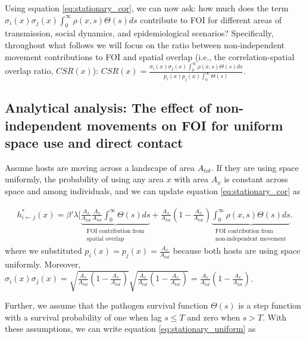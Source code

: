 \documentclass[letterpaper]{article}
\begin{document}
Using equation \ref{eq:stationary_cor}, we can now ask: how much does the term $\sigma_i(x) \sigma_j(x) \int_{0}^{\infty} \rho(x, s) \Theta(s) ds$ contribute to FOI for different areas of transmission, social dynamics, and epidemiological scenarios? Specifically, throughout what follows we will focus on the ratio between non-independent movement contributions to FOI and spatial overlap (i.e., the correlation-spatial overlap ratio, $CSR(x)$): $CSR(x) = \frac{\sigma_i(x) \sigma_j(x) \int_{0}^{\infty} \rho(x, s) \Theta(s) ds}{p_i(x) p_j(x) \int_{0}^{\infty} \Theta(s)}$.  %

\subsection*{Analytical analysis: The effect of non-independent movements on FOI for uniform space use and direct contact}

Assume hosts are moving across a landscape of area $A_{tot}$. If they are using space uniformly, the probability of using any area $x$ with area $A_x$ is constant across space and among individuals, and we can update equation \ref{eq:stationary_cor} as

\begin{equation}
    \begin{aligned}
    h^*_{i \leftarrow j}(x) = \beta' \lambda [ \underbrace{\frac{A_x}{A_{tot}}\frac{A_x}{A_{tot}} \int_{0}^{\infty} \Theta(s) ds}_{\substack{\text{FOI contribution from} \\ \text{spatial overlap}}} + \frac{A_x}{A_{tot}} (1 - \frac{A_x}{A_{tot}})\underbrace{\int_{0}^{\infty} \rho(x, s) \Theta(s) ds}_{\substack{\text{FOI contribution from} \\ \text{non-independent movement}}}.
    \end{aligned}
    \label{eq:stationary_uniform}
\end{equation}
where we substituted $p_i(x) = p_j(x) = \frac{A_x}{A_{tot}}$ because both hosts are using space uniformly.  Moreover, $\sigma_i(x) \sigma_j(x) = \sqrt{\frac{A_x}{A_{tot}}(1 - \frac{A_x}{A_{tot}})}\sqrt{\frac{A_x}{A_{tot}}(1 - \frac{A_x}{A_{tot}})} = \frac{A_x}{A_{tot}}(1 - \frac{A_x}{A_{tot}})$.

Further, we assume that the pathogen survival function $\Theta(s)$ is a step function with a survival probability of one when lag $s \leq T$ and zero when $s > T$. With these assumptions, we can write equation \ref{eq:stationary_uniform} as
\end{document}
